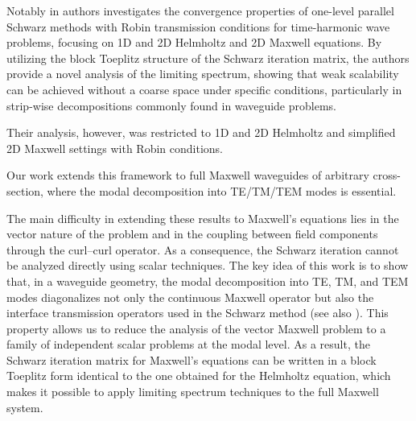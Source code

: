 \documentclass[smallextended]{svjour3}       %
\begin{document}
Notably in \cite{Bootland:2022:APS} authors investigates the convergence properties of one-level parallel Schwarz methods with Robin transmission conditions for time-harmonic wave problems, focusing on 1D and 2D Helmholtz and 2D Maxwell equations. By utilizing the block Toeplitz structure of the Schwarz iteration matrix, the authors provide a novel analysis of the limiting spectrum, showing that weak scalability can be achieved without a coarse space under specific conditions, particularly in strip-wise decompositions commonly found in waveguide problems. {Their analysis, however, was restricted to 1D and 2D Helmholtz and simplified 2D Maxwell settings with Robin conditions. 

Our work extends this framework to full Maxwell waveguides of arbitrary cross-section, where the modal decomposition into TE/TM/TEM modes is essential.} The main difficulty in extending these results to Maxwell’s equations lies in the vector nature of the problem and in the coupling between field components through the curl–curl operator. As a consequence, the Schwarz iteration cannot be analyzed directly using scalar techniques. The key idea of this work is to show that, in a waveguide geometry, the modal decomposition into TE, TM, and TEM modes diagonalizes not only the continuous Maxwell operator but also the interface transmission operators used in the Schwarz method (see also \cite{Dolean:2015:ETC}). This property allows us to reduce the analysis of the vector Maxwell problem to a family of independent scalar problems at the modal level. As a result, the Schwarz iteration matrix for Maxwell’s equations can be written in a block Toeplitz form identical to the one obtained for the Helmholtz equation, which makes it possible to apply limiting spectrum techniques to the full Maxwell system.
\end{document}
